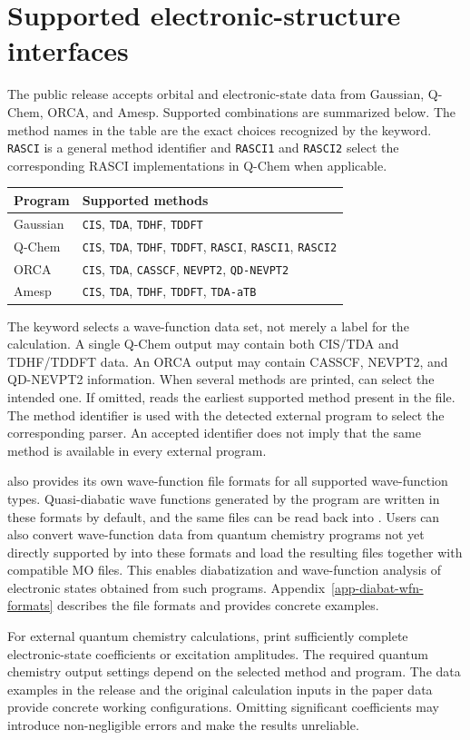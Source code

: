 \section{Supported electronic-structure interfaces}\label{sec-method-support}
The public release accepts orbital and electronic-state data from Gaussian, Q-Chem, ORCA, and Amesp. Supported combinations are summarized below. The method names in the table are the exact choices recognized by the  keyword. \texttt{RASCI} is a general method identifier and \texttt{RASCI1} and \texttt{RASCI2} select the corresponding RASCI implementations in Q-Chem when applicable.
\begin{center}
\begin{tabularx}{\textwidth}{p{} X}
\hline
Program & Supported methods \\\hline
Gaussian & \texttt{CIS}, \texttt{TDA}, \texttt{TDHF}, \texttt{TDDFT} \\
Q-Chem & \texttt{CIS}, \texttt{TDA}, \texttt{TDHF}, \texttt{TDDFT}, \texttt{RASCI}, \texttt{RASCI1}, \texttt{RASCI2} \\
ORCA & \texttt{CIS}, \texttt{TDA}, \texttt{CASSCF}, \texttt{NEVPT2}, \texttt{QD-NEVPT2} \\
Amesp & \texttt{CIS}, \texttt{TDA}, \texttt{TDHF}, \texttt{TDDFT}, \texttt{TDA-aTB} \\\hline
\end{tabularx}
\end{center}
The  keyword selects a wave-function data set, not merely a label for the calculation. A single Q-Chem output may contain both CIS/TDA and TDHF/TDDFT data. An ORCA output may contain CASSCF, NEVPT2, and QD-NEVPT2 information. When several methods are printed,  can select the intended one. If omitted, \progname{} reads the earliest supported method present in the file. The method identifier is used with the detected external program to select the corresponding parser. An accepted identifier does not imply that the same method is available in every external program.

\progname{} also provides its own wave-function file formats for all supported wave-function types. Quasi-diabatic wave functions generated by the program are written in these formats by default, and the same files can be read back into \progname{}. Users can also convert wave-function data from quantum chemistry programs not yet directly supported by \progname{} into these formats and load the resulting files together with compatible MO files. This enables diabatization and wave-function analysis of electronic states obtained from such programs. Appendix~\ref{app-diabat-wfn-formats} describes the file formats and provides concrete examples.

For external quantum chemistry calculations, print sufficiently complete electronic-state coefficients or excitation amplitudes.
The required quantum chemistry output settings depend on the selected method and program. The data examples in the release and the original calculation inputs in the paper data provide concrete working configurations.
Omitting significant coefficients may introduce non-negligible errors and make the results unreliable.

